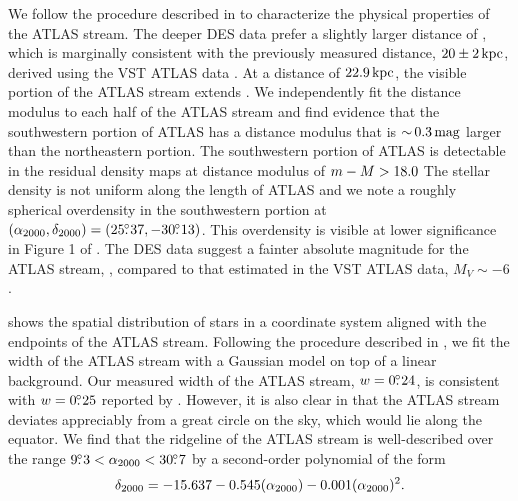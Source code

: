 \documentclass[twocolumn]{aastex61}
\begin{document}
We follow the procedure described in  to characterize the physical properties of the ATLAS stream. 
The deeper DES data prefer a slightly larger distance of , which is marginally consistent with the previously measured distance, $20 \pm 2 \mathrm{\,kpc}$, derived using the VST ATLAS data \citep{Koposov:2014}.
At a distance of $22.9\mathrm{\,kpc}$, the visible portion of the ATLAS stream extends \CHECK{$9.0 \kpc$}.
We independently fit the distance modulus to each half of the ATLAS stream and find evidence that the southwestern portion of ATLAS has a distance modulus that is $ {\sim}\, 0.3 \mathrm{\,mag}$ larger than the northeastern portion.  
The southwestern portion of ATLAS is detectable in the residual density maps at distance modulus of $m - M > 18.0$
The stellar density is not uniform along the length of ATLAS and we note a roughly spherical overdensity in the southwestern portion at $({\alpha_{2000}},{\delta_{2000}}) = (25\mbox{$.\!\!^\circ$}37,-30\mbox{$.\!\!^\circ$}13)$. 
This overdensity is visible at lower significance in Figure 1 of \citealt{Koposov:2014}.
The DES data suggest a fainter absolute magnitude for the ATLAS stream, , compared to that estimated in the VST ATLAS data, $M_V \sim -6$ \citep{Koposov:2014}.

 shows the spatial distribution of stars in a coordinate system aligned with the endpoints of the ATLAS stream.  
Following the procedure described in , we fit the width of the ATLAS stream with a Gaussian model on top of a linear background. 
Our measured width of the ATLAS stream, $w = 0\mbox{$.\!\!^\circ$}24$, is consistent with $w = 0\mbox{$.\!\!^\circ$}25$ reported by \citet{Koposov:2014}. 
However, it is also clear in  that the ATLAS stream deviates appreciably from a great circle on the sky, which would lie along the equator.
We find that the ridgeline of the ATLAS stream is well-described over the range $9\mbox{$.\!\!^\circ$}3 < {\alpha_{2000}} < 30\mbox{$.\!\!^\circ$}7$ by a second-order polynomial of the form
\begin{equation}
\label{eqn:atlas}
\dec = -15.637 - 0.545 (\ra) - 0.001(\ra)^2.
\end{equation}
\end{document}
